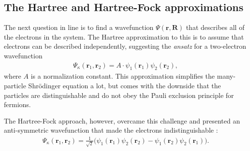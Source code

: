 \subsection{The Hartree and Hartree-Fock approximations}

The next question in line is to find a wavefunction $\Psi(\boldsymbol{r},\boldsymbol{R})$ that describes all of the electrons in the system. The Hartree \cite{Persson2020, DavidSholl2009} approximation to this is to assume that electrons can be described independently, suggesting the \textit{ansatz} for a two-electron wavefunction
\begin{align}
  \Psi_\kappa(\boldsymbol{r}_1,\boldsymbol{r}_2) = A \cdot \psi_1(\boldsymbol{r}_1) \psi_2(\boldsymbol{r}_2),
\end{align}
where $A$ is a normalization constant. This approximation simplifies the many-particle Shrödinger equation a lot, but comes with the downside that the particles are distinguishable and do not obey the Pauli exclusion principle for fermions.

The Hartree-Fock approach, however, overcame this challenge and presented an anti-symmetric wavefunction that made the electrons indistinguishable \cite{Griffiths2017}:
\begin{align}
  \Psi_\kappa(\boldsymbol{r}_1,\boldsymbol{r}_2) = \frac{1}{\sqrt{2}}\Big( \psi_1(\boldsymbol{r}_1) \psi_2(\boldsymbol{r}_2)  - {\psi_1(\boldsymbol{r}_2)\psi_2(\boldsymbol{r}_1)}\Big).
\end{align}


